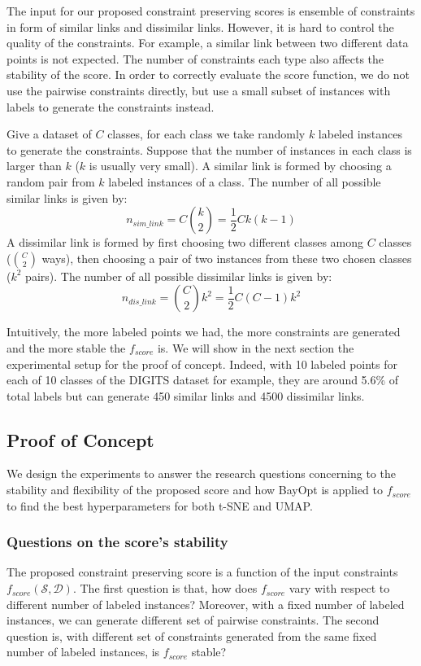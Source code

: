 The input for our proposed constraint preserving scores is ensemble of constraints in form of similar links and dissimilar links.
However, it is hard to control the quality of the constraints.
For example, a similar link between two different data points is not expected.
The number of constraints each type also affects the stability of the score.
In order to correctly evaluate the score function, we do not use the pairwise constraints directly, but use a small subset of instances with labels to generate the constraints instead.

Give a dataset of $C$ classes, for each class we take randomly $k$ labeled instances to generate the constraints.
Suppose that the number of instances in each class is larger than $k$ ($k$ is usually very small).
A similar link is formed by choosing a random pair from $k$ labeled instances of a class.
The number of all possible similar links is given by:
\begin{equation}\label{equ:n-sim-link}
n_{sim\_link} = C {k \choose 2} = \frac{1}{2} C k (k-1)
\end{equation}
A dissimilar link is formed by first choosing two different classes among $C$ classes (${C \choose 2}$ ways),
then choosing a pair of two instances from these two chosen classes ($k^2$ pairs).
The number of all possible dissimilar links is given by:
\begin{equation}\label{equ:n-dis-link}
n_{dis\_link} = {C \choose 2} k^2 = \frac{1}{2} C (C-1) k^2
\end{equation}

Intuitively, the more labeled points we had, the more constraints are generated and the more stable the $f_{score}$ is.
We will show in the next section the experimental setup for the proof of concept.
Indeed, with 10 labeled points for each of 10 classes of the DIGITS dataset for example, they are around 5.6\% of total labels but can generate 450 similar links and 4500 dissimilar links.


\subsection{Proof of Concept}
We design the experiments to answer the research questions concerning to the stability and flexibility of the proposed score and how BayOpt is applied to $f_{score}$ to find the best hyperparameters for both t-SNE and UMAP.

\subsubsection*{Questions on the score's stability}
The proposed constraint preserving score is a function of the input constraints $f_{score}(\mathcal{S}, \mathcal{D})$.
The first question is that, how does $f_{score}$ vary with respect to different number of labeled instances?
Moreover, with a fixed number of labeled instances, we can generate different set of pairwise constraints.
The second question is, with different set of constraints generated from the same fixed number of labeled instances, is $f_{score}$ stable?


